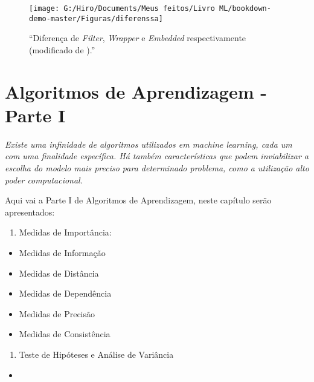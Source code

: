\documentclass[
]{book}
\providecommand{\tightlist}{%
  \setlength{\itemsep}{0pt}\setlength{\parskip}{0pt}}
\begin{document}
\begin{figure}

{\centering \texttt{[image: G:/Hiro/Documents/Meus feitos/Livro ML/bookdown-demo-master/Figuras/diferenssa]} 

}

\caption{``Diferença de \emph{Filter}, \emph{Wrapper} e \emph{Embedded} respectivamente (modificado de \citet{covoes2010seleccao}).''}\label{fig:diferenssa}
\end{figure}



\hypertarget{Algoritmosaprendizagem}{%
\chapter{Algoritmos de Aprendizagem - Parte I}\label{Algoritmosaprendizagem}}

\emph{Existe uma infinidade de algoritmos utilizados em machine learning, cada um com uma finalidade específica. Há também características que podem inviabilizar a escolha do modelo mais preciso para determinado problema, como a utilização alto poder computacional.}

Aqui vai a Parte I de Algoritmos de Aprendizagem, neste capítulo serão apresentados:

\begin{enumerate}
\def\labelenumi{\arabic{enumi}.}
\tightlist
\item
  Medidas de Importância:
\end{enumerate}

\begin{itemize}
\tightlist
\item
  Medidas de Informação
\item
  Medidas de Distância
\item
  Medidas de Dependência
\item
  Medidas de Precisão
\item
  Medidas de Consistência
\end{itemize}

\begin{enumerate}
\def\labelenumi{\arabic{enumi}.}
\setcounter{enumi}{1}
\tightlist
\item
  Teste de Hipóteses e Análise de Variância
\end{enumerate}

\begin{itemize}
\item
\end{itemize}
\end{document}

